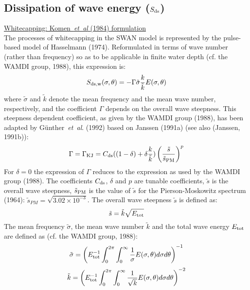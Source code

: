 \documentclass[12pt]{book}
\begin{document}
\subsection{Dissipation of wave energy ($S_{\rm ds}$)} \label{sec:dissip}

\noindent
\underline{Whitecapping: Komen~{\it et~al} (1984) formulation}\\[2ex]
The processes of whitecapping in the SWAN model is represented by the pulse-based model of
Hasselmann (1974). Reformulated in terms of wave number (rather than frequency) so as to be
applicable in finite water depth (cf. the WAMDI group, 1988), this expression is:
\begin{equation}
  S_{\rm ds,w} (\sigma,\theta) = -\Gamma \tilde{\sigma} \frac{k}{\tilde{k}} E (\sigma,\theta)
  \label{eq3-11}
\end{equation}
where ${\tilde{\sigma}}$ and ${\tilde{k}}$ denote the mean frequency and the mean wave number,
respectively, and the coefficient $\Gamma$ depends on the overall wave steepness. This steepness dependent
coefficient, as given by the WAMDI group (1988), has been adapted by G\"{u}nther~{\it et~al}. (1992) based on
Janssen (1991a) (see also (Janssen, 1991b)):
\begin{equation}
   \Gamma = \Gamma_{\rm KJ} = C_{\rm ds} ((1-\delta) + \delta \frac{k}{\tilde{k}})
   \left(\frac{\tilde{s}}{\tilde{s}_{\rm PM}} \right)^p
  \label{eq3-12}
\end{equation}
For $\delta=0$ the expression of $\Gamma$ reduces to the expression as used by the WAMDI group (1988). The
coefficients $C_{\rm ds}$, $\delta$ and $p$ are tunable coefficients, ${\tilde{s}}$ is the overall wave
steepness, ${\tilde{s}}_{\rm PM}$ is the value of ${\tilde{s}}$ for the Pierson-Moskowitz
spectrum (1964): ${\tilde{s}}_{PM} = \sqrt{3.02 \times 10^{-3}}$. The overall wave steepness ${\tilde{s}}$
is defined as:
\begin{equation}
  \tilde{s} = \tilde{k} \sqrt{E_{\rm tot}}
  \label{eq3-13}
\end{equation}
The mean frequency ${\tilde{\sigma}}$, the mean wave number ${\tilde{k}}$ and the total wave energy
$E_{\rm tot}$ are defined as (cf. the WAMDI group, 1988):
\begin{equation}
  \tilde{\sigma} = \left( E^{-1}_{\rm tot} \int_{0}^{2\pi} \int_{0}^{\infty} \frac{1}{\sigma}E(\sigma,\theta) d\sigma d\theta \right)^{-1}
  \label{eq3-14}
\end{equation}
\begin{equation}
  \tilde{k} = \left(E^{-1}_{\rm tot} \int_{0}^{2\pi} \int_{0}^{\infty} \frac{1}{\sqrt{k}}E(\sigma,\theta) d\sigma d\theta\right)^{-2}
  \label{eq3-15}
\end{equation}
\end{document}
